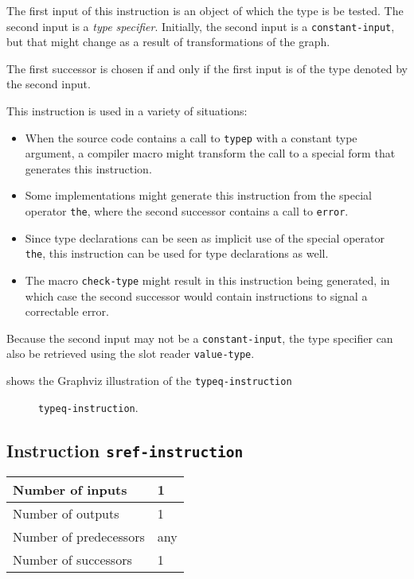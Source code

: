 The first input of this instruction is an object of which the type
is be tested.  The second input is a \emph{type specifier}.
Initially, the second input is a \texttt{constant-input}, but that
might change as a result of transformations of the graph.  

The first successor is chosen if and only if the first input is of the
type denoted by the second input. 

This instruction is used in a variety of situations:

\begin{itemize}
\item When the source code contains a call to \texttt{typep} with a
  constant type argument, a compiler macro might transform the call to
  a special form that generates this instruction.
\item Some implementations might generate this instruction from the
  special operator \texttt{the}, where the second successor contains a
  call to \texttt{error}.
\item Since type declarations can be seen as implicit use of the
  special operator \texttt{the}, this instruction can be used for type
  declarations as well.
\item The macro \texttt{check-type} might result in this instruction
  being generated, in which case the second successor would contain
  instructions to signal a correctable error.
\end{itemize}

Because the second input may not be a \texttt{constant-input}, the
type specifier can also be retrieved using the slot reader
\texttt{value-type}. 

 shows the Graphviz illustration of the
\texttt{typeq-instruction}

\begin{figure}
\begin{center}
\end{center}
\caption{\label{fig-typeq-instruction}
\texttt{typeq-instruction}.}
\end{figure}

\subsection{Instruction \texttt{sref-instruction}}
\label{mir-instruction-sref}

\begin{tabular}{|l|l|}
\hline
Number of inputs & 1\\
\hline
Number of outputs & 1\\
\hline
Number of predecessors & any\\
\hline
Number of successors & 1\\
\hline
\end{tabular}

